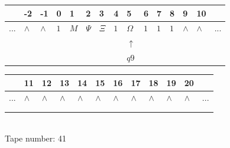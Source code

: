 \documentclass[11pt]{article}
\begin{document}
\begin{table}[H]
\centering
\begin{tabular}{lllllllllllllll}
 & -2 & -1 & 0 & 1 & 2 & 3 & 4 & 5 & 6 & 7 & 8 & 9 & 10 & \\
\hline
$...$ & \multicolumn{1}{|l|}{$\wedge$} & \multicolumn{1}{|l|}{$\wedge$} & \multicolumn{1}{|l|}{$1$} & \multicolumn{1}{|l|}{$M$} & \multicolumn{1}{|l|}{$\Psi$} & \multicolumn{1}{|l|}{$\Xi$} & \multicolumn{1}{|l|}{$1$} & \multicolumn{1}{|l|}{$\Omega$} & \multicolumn{1}{|l|}{$1$} & \multicolumn{1}{|l|}{$1$} & \multicolumn{1}{|l|}{$1$} & \multicolumn{1}{|l|}{$\wedge$} & \multicolumn{1}{|l|}{$\wedge$} & $...$\\
\hline
&  &  &  &  &  &  &  & $\uparrow$ &  &  &  &  &  &  \\
&  &  &  &  &  &  &  & $ q9 $ &  &  &  &  &  &  \\
\end{tabular}
\begin{tabular}{llllllllllll}
 & 11 & 12 & 13 & 14 & 15 & 16 & 17 & 18 & 19 & 20 & \\
\hline
$...$ & \multicolumn{1}{|l|}{$\wedge$} & \multicolumn{1}{|l|}{$\wedge$} & \multicolumn{1}{|l|}{$\wedge$} & \multicolumn{1}{|l|}{$\wedge$} & \multicolumn{1}{|l|}{$\wedge$} & \multicolumn{1}{|l|}{$\wedge$} & \multicolumn{1}{|l|}{$\wedge$} & \multicolumn{1}{|l|}{$\wedge$} & \multicolumn{1}{|l|}{$\wedge$} & \multicolumn{1}{|l|}{$\wedge$} & $...$\\
\hline
&  &  &  &  &  &  &  &  &  &  &  \\
&  &  &  &  &  &  &  &  &  &  &  \\
\end{tabular}
\\
Tape number: 41
\noindent\makebox[\linewidth]{\hdashrule{\textwidth}{1pt}{1pt}}\end{table}
\end{document}
